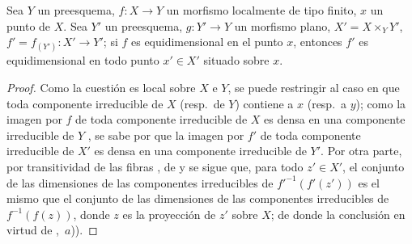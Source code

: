 \begin{proposition}[13.3.8]
\label{IV.13.3.8}
Sea $Y$ un preesquema, $f:X\to Y$ un morfismo localmente de tipo finito, $x$ un punto de $X$.
Sea $Y'$ un preesquema, $g:Y'\to Y$ un morfismo \textup{plano}, $X'=X\times_Y Y'$, $f'=f_{(Y')}:X'\to Y'$; si $f$ es equidimensional en el punto $x$, entonces $f'$ es equidimensional en todo punto $x'\in X'$ situado sobre $x$.
\end{proposition}

\begin{proof}
Como la cuestión es local sobre $X$ e $Y$, se puede restringir al caso en que toda componente irreducible de $X$ (resp.\ de $Y$) contiene a $x$ (resp.\ a $y$); como la imagen por $f$ de toda componente irreducible de $X$ es densa en una componente irreducible de $Y$ , se sabe por  que la imagen por $f'$ de toda componente irreducible de $X'$ es densa en una componente irreducible de $Y'$.
Por otra parte, por transitividad de las fibras , de  y  se sigue que, para todo $z'\in X'$, el conjunto de las dimensiones de las componentes irreducibles de ${f'}^{-1}(f'(z'))$ es el mismo que el conjunto de las dimensiones de las componentes irreducibles de $f^{-1}(f(z))$, donde $z$ es la proyección de $z'$ sobre $X$; de donde la conclusión en virtud de ,~$a$)).
\end{proof}

